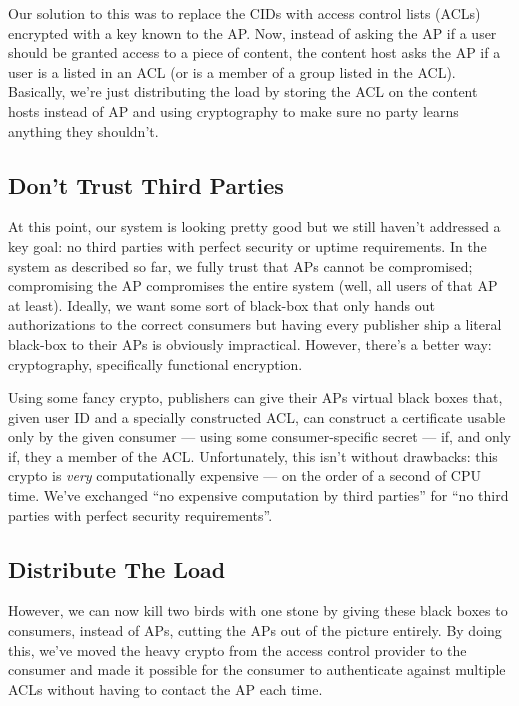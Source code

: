 \documentclass[pdftex,12pt,a4papaer]{report}
\begin{document}
Our solution to this was to replace the CIDs with access control lists (ACLs)
encrypted with a key known to the AP. Now, instead of asking the AP if a user
should be granted access to a piece of content, the content host asks the AP if
a user is a listed in an ACL (or is a member of a group listed in the ACL).
Basically, we're just distributing the load by storing the ACL on the content
hosts instead of AP and using cryptography to make sure no party learns anything
they shouldn't.

\subsection{Don't Trust Third Parties}

At this point, our system is looking pretty good but we still haven't addressed
a key goal: no third parties with perfect security or uptime requirements. In
the system as described so far, we fully trust that APs cannot be compromised;
compromising the AP compromises the entire system (well, all users of that AP at
least). Ideally, we want some sort of black-box that only hands out
authorizations to the correct consumers but having every publisher ship a
literal black-box to their APs is obviously impractical. However, there's a
better way: cryptography, specifically functional encryption.

Using some fancy crypto, publishers can give their APs virtual black boxes that,
given user ID and a specially constructed ACL, can construct a certificate
usable only by the given consumer --- using some consumer-specific secret ---
if, and only if, they a member of the ACL. Unfortunately, this isn't without
drawbacks: this crypto is \emph{very} computationally expensive --- on the order
of a second of CPU time. We've exchanged ``no expensive computation by third
parties'' for ``no third parties with perfect security requirements''.

\subsection{Distribute The Load}

However, we can now kill two birds with one stone by giving these black boxes to
consumers, instead of APs, cutting the APs out of the picture entirely. By doing
this, we've moved the heavy crypto from the access control provider to the
consumer and made it possible for the consumer to authenticate against multiple
ACLs without having to contact the AP each time.
\end{document}
